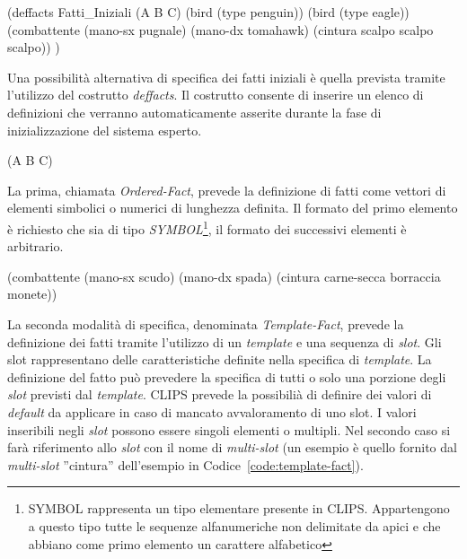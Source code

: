 \begin{program}
\begin{verbatimtab}

(deffacts Fatti_Iniziali
	(A B C)
	(bird (type penguin))
	(bird (type eagle))
	(combattente
		(mano-sx pugnale)
		(mano-dx tomahawk)
		(cintura scalpo scalpo scalpo))
)
\end{verbatimtab}
\caption{Fatto definito utilizzando la notazione \emph{Ordered-Fact}}\label{code:ordered-fact}
\end{program}


Una possibilità alternativa di specifica dei fatti iniziali è quella prevista tramite l'utilizzo del costrutto \emph{deffacts}. Il costrutto consente di inserire un elenco di definizioni che verranno automaticamente asserite durante la fase di inizializzazione del sistema esperto.

\begin{program}
\begin{verbatimtab}

(A B C)
\end{verbatimtab}
\caption{Fatto definito utilizzando la notazione \emph{Ordered-Fact}}\label{code:ordered-fact}
\end{program}

La prima, chiamata \emph{Ordered-Fact}, prevede la definizione di fatti come vettori di elementi simbolici o numerici di lunghezza definita. Il formato del primo elemento è richiesto che sia di tipo \emph{SYMBOL}\footnote{SYMBOL rappresenta un tipo elementare presente in CLIPS. Appartengono a questo tipo tutte le sequenze alfanumeriche non delimitate da apici e che abbiano come primo elemento un carattere alfabetico}, il formato dei successivi elementi è arbitrario.

\begin{program}
\begin{verbatimtab}

(combattente
	(mano-sx scudo)
	(mano-dx spada)
	(cintura carne-secca borraccia monete))
\end{verbatimtab}
\caption[Fatto definito utilizzando la notazione \emph{Template-Fact}]{Fatto definito utilizzando la notazione \emph{Template-Fact}. Il nome del template a cui il fatto fa riferimento è \emph{combattente}. La specifica del \emph{template} prevede l'esistenza degli slot ''mano-sx'', ''mano-dx'' e ''cintura''}\label{code:template-fact}
\end{program}

La seconda modalità di specifica, denominata \emph{Template-Fact}, prevede la definizione dei fatti tramite l'utilizzo di un \emph{template} e una sequenza di \emph{slot}. Gli slot rappresentano delle caratteristiche definite nella specifica di \emph{template}.
La definizione del fatto può prevedere la specifica di tutti o solo una porzione degli \emph{slot} previsti dal \emph{template}. CLIPS prevede la possibilià di definire dei valori di \emph{default} da applicare in caso di mancato avvaloramento di uno slot.
I valori inseribili negli \emph{slot} possono essere singoli elementi o multipli. Nel secondo caso si farà riferimento allo \emph{slot} con il nome di \emph{multi-slot} (un esempio è quello fornito dal \emph{multi-slot} ''cintura'' dell'esempio in Codice~\ref{code:template-fact}).

